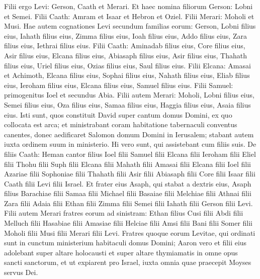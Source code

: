 \begin{biblechapter}
\begin{biblechapter}
\begin{biblechapter}
\begin{biblechapter}
\begin{biblechapter}
\begin{biblechapter}
\verse Filii ergo Levi: Gerson, Caath et Merari. 
\verse Et haec nomina filiorum Gerson: Lobni et Semei. 
\verse Filii Caath: Amram et Isaar et Hebron et Oziel. 
 \verse Filii Merari: Moholi et Musi.
 Hae autem cognationes Levi secundum familias eorum: 
\verse Gerson, Lobni filius eius, Iahath filius eius, Zimma filius eius, 
\verse Ioah filius eius, Addo filius eius, Zara filius eius, Iethrai filius eius. 
\verse Filii Caath: Aminadab filius eius, Core filius eius, Asir filius eius, 
\verse Elcana filius eius, Abiasaph filius eius, Asir filius eius, 
\verse Thahath filius eius, Uriel filius eius, Ozias filius eius, Saul filius eius. 
\verse Filii Elcana: Amasai et Achimoth, 
 \verse Elcana filius eius, Sophai filius eius, Nahath filius eius, 
\verse Eliab filius eius, Ieroham filius eius, Elcana filius eius, Samuel filius eius. 
\verse Filii Samuel: primogenitus Ioel et secundus Abia. 
\verse Filii autem Merari: Moholi, Lobni filius eius, Semei filius eius, Oza filius eius, 
\verse Samaa filius eius, Haggia filius eius, Asaia filius eius.
 \verse Isti sunt, quos constituit David super cantum domus Domini, ex quo collocata est arca; 
\verse et ministrabant coram habitatione tabernaculi conventus canentes, donec aedificaret Salomon domum Domini in Ierusalem; stabant autem iuxta ordinem suum in ministerio.
 \verse Hi vero sunt, qui assistebant cum filiis suis. De filiis Caath: Heman cantor filius Ioel filii Samuel 
\verse filii Elcana filii Ieroham filii Eliel filii Thohu 
\verse filii Suph filii Elcana filii Mahath filii Amasai 
\verse filii Elcana filii Ioel filii Azariae filii Sophoniae 
\verse filii Thahath filii Asir filii Abiasaph filii Core 
\verse filii Isaar filii Caath filii Levi filii Israel.
 \verse Et frater eius Asaph, qui stabat a dextris eius, Asaph filius Barachiae filii Samaa 
\verse filii Michael filii Basaiae filii Melchiae 
\verse filii Athnai filii Zara filii Adaia 
\verse filii Ethan filii Zimma filii Semei 
\verse filii Iahath filii Gerson filii Levi.
 \verse Filii autem Merari fratres eorum ad sinistram: Ethan filius Cusi filii Abdi filii Melluch 
\verse filii Hasabiae filii Amasiae filii Helciae 
\verse filii Amsi filii Bani filii Somer 
\verse filii Moholi filii Musi filii Merari filii Levi.
 \verse Fratres quoque eorum Levitae, qui ordinati sunt in cunctum ministerium habitaculi domus Domini; 
\verse Aaron vero et filii eius adolebant super altare holocausti et super altare thymiamatis in omne opus sancti sanctorum, et ut expiarent pro Israel, iuxta omnia quae praecepit Moyses servus Dei.

\end{biblechapter}
\end{biblechapter}
\end{biblechapter}
\end{biblechapter}
\end{biblechapter}
\end{biblechapter}
